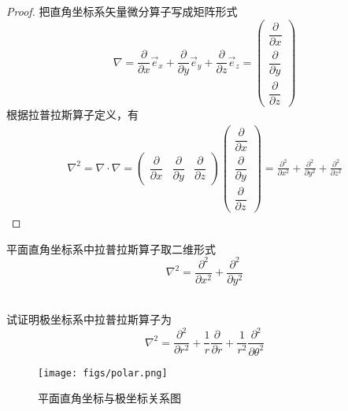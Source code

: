 \begin{proof}
	把直角坐标系矢量微分算子写成矩阵形式
	$$
\nabla=\frac{\partial}{\partial x} \vec{e}_x+\frac{\partial}{\partial y} \vec{e}_y+\frac{\partial}{\partial z} \vec{e}_z
 = \begin{pmatrix}
	\dfrac{\partial}{\partial x}\\
	\dfrac{\partial}{\partial y}\\
	\dfrac{\partial}{\partial z}
   \end{pmatrix}$$
   根据拉普拉斯算子定义，有
   $$
   \begin{aligned}
	 \nabla ^2 = \nabla \cdot \nabla  
	 = \begin{pmatrix}
		\dfrac{\partial}{\partial x}&
		\dfrac{\partial}{\partial y} &
		\dfrac{\partial}{\partial z}
	   \end{pmatrix} \begin{pmatrix}
		\dfrac{\partial}{\partial x}\\
		\dfrac{\partial}{\partial y}\\
		\dfrac{\partial}{\partial z}
	   \end{pmatrix} 
	= \frac{\partial ^2}{\partial x^2} +\frac{\partial^2 }{\partial y^2}+\frac{\partial^2 }{\partial z^2}
   \end{aligned}$$
\end{proof}
平面直角坐标系中拉普拉斯算子取二维形式   
$$\displaystyle  \nabla ^{2}  = \frac{\partial ^2}{\partial x^2} +\frac{\partial^2 }{\partial y^2}$$
~~\\ 

\begin{example}
 试证明极坐标系中拉普拉斯算子为 
 $$\nabla ^{2} =\frac{\partial ^2 }{\partial r^2 } +\frac{1}{r } \frac{\partial }{\partial r } +
	\frac{1}{r^2 } \frac{\partial ^2 }{\partial \theta ^2} $$
	\begin{figure}[h]
		\centering
		\texttt{[image: figs/polar.png]}
		\caption{平面直角坐标与极坐标关系图}
		\label{fig:polar}
	\end{figure}
\end{example}

